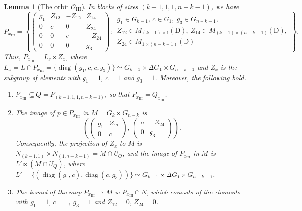 \documentclass[11pt]{amsart}
\numberwithin{equation}{section}
\theoremstyle{plain}
\newtheorem{lemma}[theorem]{Lemma}
\theoremstyle{definition}
\theoremstyle{remark}
\DeclareMathOperator{\diag}{diag}
\newcommand{\OIII}{\mathcal{O}_{\mathrm{III}}}
\begin{document}
\begin{lemma}[The orbit $\OIII$]\label{lem:stab-III}
	In blocks of sizes $(k-1,1,1,n-k-1)$, we have
	$$
	P_{x_{\mathrm{III}}}=\left\{\begin{pmatrix}g_1&Z_{12}&-Z_{12}&Z_{14}\\0&c&0&Z_{24}\\0&0&c&-Z_{24}\\0&0&0&g_3\end{pmatrix}:\ \begin{array}{l}g_1\in G_{k-1},\ c\in G_1,\ g_3\in G_{n-k-1},\\ Z_{12}\in M_{(k-1)\times1}(\mathrm{D}),\ Z_{14}\in M_{(k-1)\times(n-k-1)}(\mathrm{D}),\\ Z_{24}\in M_{1\times(n-k-1)}(\mathrm{D})\end{array}\right\}.
	$$
	Thus, $P_{x_{\mathrm{III}}}=L_x\ltimes Z_x$, where $L_x=L\cap P_{x_{\mathrm{III}}}=\{\diag(g_1,c,c,g_3)\}\simeq G_{k-1}\times\Delta G_1\times G_{n-k-1}$ and $Z_x$ is the subgroup of elements with $g_1=1$, $c=1$ and $g_3=1$. Moreover, the following hold.
	\begin{enumerate}
		\item $P_{x_{\mathrm{III}}}\subseteq Q=P_{(k-1,1,1,n-k-1)}$, so that $P_{x_{\mathrm{III}}}=Q_{x_{\mathrm{III}}}$.
		\item The image of $p\in P_{x_{\mathrm{III}}}$ in $M=G_k\times G_{n-k}$ is
		$$
		\left(\begin{pmatrix}g_1&Z_{12}\\0&c\end{pmatrix},\ \begin{pmatrix}c&-Z_{24}\\0&g_3\end{pmatrix}\right).
		$$
		Consequently, the projection of $Z_x$ to $M$ is $N_{(k-1,1)}\times N_{(1,n-k-1)}=M\cap U_Q$, and the image of $P_{x_{\mathrm{III}}}$ in $M$ is $L'\ltimes(M\cap U_Q)$, where $L'=\{(\diag(g_1,c),\diag(c,g_3))\}\simeq G_{k-1}\times\Delta G_1\times G_{n-k-1}$.
		\item The kernel of the map $P_{x_{\mathrm{III}}}\to M$ is $P_{x_{\mathrm{III}}}\cap N$, which consists of the elements with $g_1=1$, $c=1$, $g_3=1$ and $Z_{12}=0$, $Z_{24}=0$.
	\end{enumerate}
\end{lemma}
\end{document}
